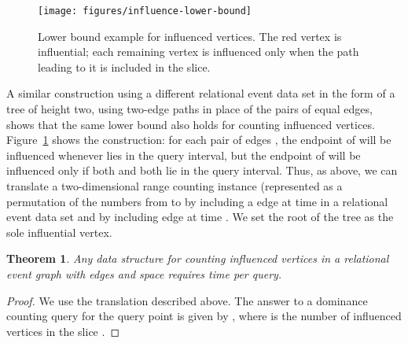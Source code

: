 \documentclass[11pt]{article}
\newtheorem{theorem}{Theorem}
\begin{document}
\begin{figure}[t]
\centering
\texttt{[image: figures/influence-lower-bound]}
\caption{Lower bound example for influenced vertices. The red vertex is influential; each remaining vertex is influenced only when the path leading to it is included in the slice.}
\label{fig:influence-lower-bound}
\end{figure}

A similar construction using a different relational event data set in the form of a tree of height two, using two-edge paths in place of the pairs of equal edges, shows that the same lower bound also holds for counting influenced vertices. Figure~\ref{fig:influence-lower-bound} shows the construction: for each pair of edges , the endpoint of  will be influenced whenever  lies in the query interval, but the endpoint of  will be influenced only if both  and  both lie in the query interval. Thus, as above, we can translate a two-dimensional range counting instance (represented as a permutation  of the numbers from  to  by including a edge  at time  in a relational event data set and by including edge  at time . We set the root of the tree as the sole influential vertex.

\begin{theorem}
\label{thm:lb2}
Any data structure for counting influenced vertices in a relational event graph with  edges and space  requires  time per query.
\end{theorem}

\begin{proof}
We use the translation described above. The answer to a dominance counting query for the query point  is given by , where  is the number of influenced vertices in the slice .
\end{proof}
\end{document}
